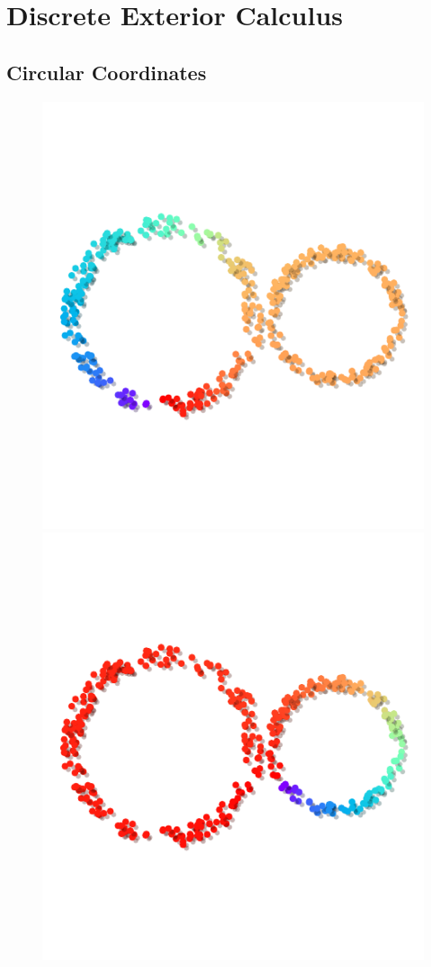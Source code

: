 \section{Discrete Exterior Calculus} %
\label{sec:dec}

\subsection{Circular Coordinates}

\begin{figure}[htbp]
\centering
  \includegraphics[scale=1.]{figures/circular_coords1.pdf}
  \includegraphics[scale=1.]{figures/circular_coords2.pdf}\\\vspace{-7ex}

\end{figure}
